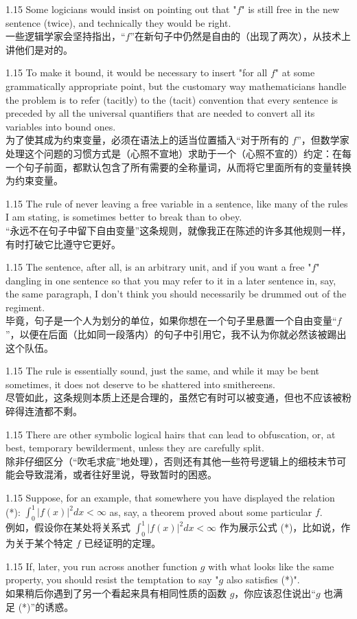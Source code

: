 \documentclass[12pt,a4paper]{article}
\newcommand{\bilingual}[2]{
    \begin{spacing}{1.15} %
        \noindent \normalsize #1 \\[-0.5ex] %
        \small \textcolor{blue!70!black}{#2} %
    \end{spacing}
    \vspace{0.8em} %
}
\begin{document}
\bilingual{Some logicians would insist on pointing out that "$f$" is still free in the new sentence (twice), and technically they would be right.}
{一些逻辑学家会坚持指出，“$f$”在新句子中仍然是自由的（出现了两次），从技术上讲他们是对的。} %

\bilingual{To make it bound, it would be necessary to insert "for all $f$" at some grammatically appropriate point, but the customary way mathematicians handle the problem is to refer (tacitly) to the (tacit) convention that every sentence is preceded by all the universal quantifiers that are needed to convert all its variables into bound ones.}
{为了使其成为约束变量，必须在语法上的适当位置插入“对于所有的 $f$”，但数学家处理这个问题的习惯方式是（心照不宣地）求助于一个（心照不宣的）约定：在每一个句子前面，都默认包含了所有需要的全称量词，从而将它里面所有的变量转换为约束变量。} %

\bilingual{The rule of never leaving a free variable in a sentence, like many of the rules I am stating, is sometimes better to break than to obey.}
{“永远不在句子中留下自由变量”这条规则，就像我正在陈述的许多其他规则一样，有时打破它比遵守它更好。} %

\bilingual{The sentence, after all, is an arbitrary unit, and if you want a free "$f$" dangling in one sentence so that you may refer to it in a later sentence in, say, the same paragraph, I don't think you should necessarily be drummed out of the regiment.}
{毕竟，句子是一个人为划分的单位，如果你想在一个句子里悬置一个自由变量“$f$”，以便在后面（比如同一段落内）的句子中引用它，我不认为你就必然该被踢出这个队伍。} %

\bilingual{The rule is essentially sound, just the same, and while it may be bent sometimes, it does not deserve to be shattered into smithereens.}
{尽管如此，这条规则本质上还是合理的，虽然它有时可以被变通，但也不应该被粉碎得连渣都不剩。} %

\bilingual{There are other symbolic logical hairs that can lead to obfuscation, or, at best, temporary bewilderment, unless they are carefully split.}
{除非仔细区分（“吹毛求疵”地处理），否则还有其他一些符号逻辑上的细枝末节可能会导致混淆，或者往好里说，导致暂时的困惑。} %

\bilingual{Suppose, for an example, that somewhere you have displayed the relation (*): $\int_{0}^{1}|f(x)|^{2}dx<\infty$ as, say, a theorem proved about some particular $f$.}
{例如，假设你在某处将关系式 $\int_{0}^{1}|f(x)|^{2}dx<\infty$ 作为展示公式 (*)，比如说，作为关于某个特定 $f$ 已经证明的定理。} %

\bilingual{If, later, you run across another function $g$ with what looks like the same property, you should resist the temptation to say "$g$ also satisfies (*)".}
{如果稍后你遇到了另一个看起来具有相同性质的函数 $g$，你应该忍住说出“$g$ 也满足 (*)”的诱惑。} %
\end{document}

